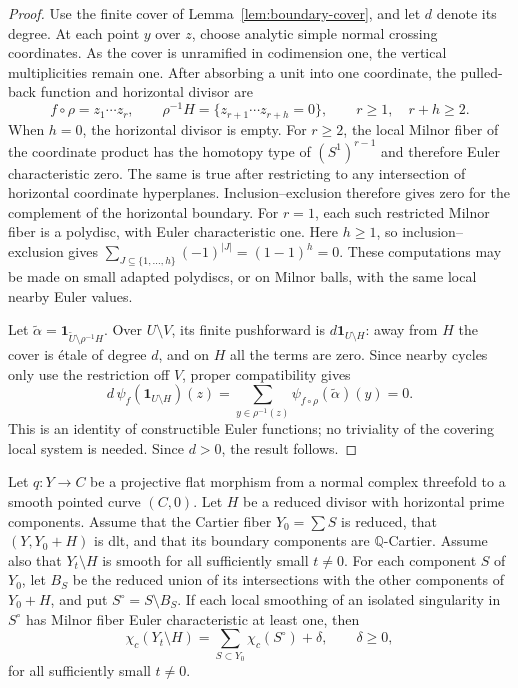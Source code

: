 \begin{proof}
Use the finite cover of Lemma~\ref{lem:boundary-cover}, and let $d$
denote its degree.  At each point
$y$ over $z$, choose analytic simple normal crossing coordinates.  As
the cover is unramified in codimension one, the vertical
multiplicities remain one.  After absorbing a unit into one
coordinate, the pulled-back function and horizontal divisor are
\[
 f\circ\rho=z_1\cdots z_r,
 \qquad
 \rho^{-1}H=\{z_{r+1}\cdots z_{r+h}=0\},
 \qquad r\ge1,\quad r+h\ge2.
\]
When $h=0$, the horizontal divisor is empty.  For $r\ge2$, the local
Milnor fiber of the coordinate product has the homotopy type of
$(S^1)^{r-1}$ and therefore Euler characteristic zero.  The same is
true after restricting to any intersection of horizontal coordinate
hyperplanes.  Inclusion--exclusion therefore gives zero for the
complement of the horizontal boundary.  For $r=1$, each such
restricted Milnor fiber is a polydisc, with Euler characteristic
one.  Here $h\ge1$, so inclusion--exclusion gives
$\sum_{J\subseteq\{1,\ldots,h\}}(-1)^{|J|}=(1-1)^h=0$.
These computations may be made on small adapted polydiscs, or on
Milnor balls, with the same local nearby Euler values.

Let $\widetilde\alpha=\mathbf1_{\widetilde U\setminus\rho^{-1}H}$.
Over $U\setminus V$, its finite pushforward is
$d\mathbf1_{U\setminus H}$: away from $H$ the cover is \'etale of
degree $d$, and on $H$ all the terms are zero.  Since nearby cycles
only use the restriction off $V$, proper compatibility gives
\[
 d\,\psi_f(\mathbf1_{U\setminus H})(z)
  =\sum_{y\in\rho^{-1}(z)}
    \psi_{f\circ\rho}(\widetilde\alpha)(y)=0.
\]
This is an identity of constructible Euler functions; no triviality
of the covering local system is needed.  Since $d>0$, the result
follows.
\end{proof}

\begin{proposition}
\label{prop:nearby-euler-comparison}
Let $q:Y\to C$ be a projective flat morphism from a normal complex
threefold to a smooth pointed curve $(C,0)$.  Let $H$ be a reduced
divisor with horizontal prime components.  Assume that the Cartier
fiber $Y_0=\sum S$ is reduced, that $(Y,Y_0+H)$ is dlt, and that its
boundary components are $\mathbb Q$-Cartier.  Assume also that
$Y_t\setminus H$ is smooth for all sufficiently small $t\ne0$.
For each component $S$ of $Y_0$, let $B_S$ be the reduced union of its
intersections with the other components of $Y_0+H$, and put
$S^\circ=S\setminus B_S$.  If each local smoothing of an isolated
singularity in $S^\circ$ has Milnor fiber Euler characteristic at
least one, then
\begin{equation}
\label{eq:nearby-euler-comparison}
 \chi_c(Y_t\setminus H)
   =\sum_{S\subset Y_0}\chi_c(S^\circ)+\delta,
 \qquad \delta\ge0,
\end{equation}
for all sufficiently small $t\ne0$.
\end{proposition}

